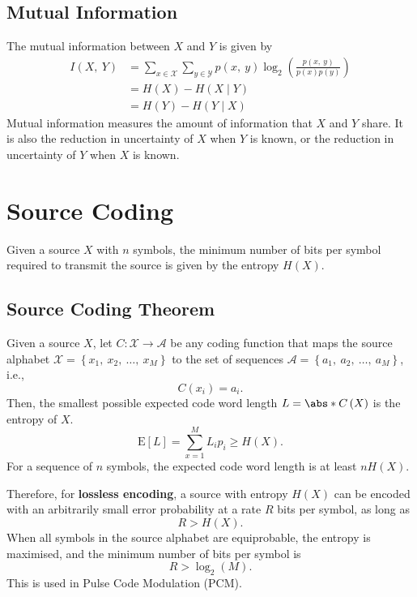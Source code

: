 \documentclass{article}
\begin{document}
\subsection{Mutual Information}
The mutual information between \(X\) and \(Y\) is given by
\begin{align*}
    I\left( X,\: Y \right) & = \sum_{x \in \mathcal{X}} \sum_{y \in \mathcal{Y}} p\left( x,\: y \right) \log_2{\left( \frac{p\left( x,\: y \right)}{p\left( x \right) p\left( y \right)} \right)} \\
                           & = H\left( X \right) - H\left( X \mid Y \right)                                                                                                                       \\
                           & = H\left( Y \right) - H\left( Y \mid X \right)
\end{align*}
Mutual information measures the amount of information that \(X\) and
\(Y\) share. It is also the reduction in uncertainty of \(X\) when \(Y\)
is known, or the reduction in uncertainty of \(Y\) when \(X\) is known.
\section{Source Coding}
Given a source \(X\) with \(n\) symbols, the minimum number of bits per
symbol required to transmit the source is given by the entropy
\(H\left( X \right)\).
\subsection{Source Coding Theorem}
Given a source \(X\), let \(C : \mathcal{X} \to \mathcal{A}\) be any
coding function that maps the source alphabet \(\mathcal{X} = \left\{
x_1,\: x_2,\: \dots,\: x_M \right\}\) to the set of sequences
\(\mathcal{A} = \left\{ a_1,\: a_2,\: \dots,\: a_M \right\}\), i.e.,
\begin{equation*}
    C\left( x_i \right) = a_i.
\end{equation*}
Then, the smallest possible expected code word length
\(L = \abs*{C\left( X \right)}\) is the entropy of \(X\).
\begin{equation*}
    \mathrm{E}\left[ L \right] = \sum_{x = 1}^M L_i p_i \geqslant H\left( X \right).
\end{equation*}
For a sequence of \(n\) symbols, the expected code word length is at
least \(n H\left( X \right)\).

Therefore, for \textbf{lossless encoding}, a source with entropy
\(H\left( X \right)\) can be encoded with an arbitrarily small error
probability at a rate \(R\) bits per symbol, as long as
\begin{equation*}
    R > H\left( X \right).
\end{equation*}
When all symbols in the source alphabet are equiprobable, the entropy
is maximised, and the minimum number of bits per symbol is
\begin{equation*}
    R > \log_2{\left( M \right)}.
\end{equation*}
This is used in Pulse Code Modulation (PCM).
\end{document}

